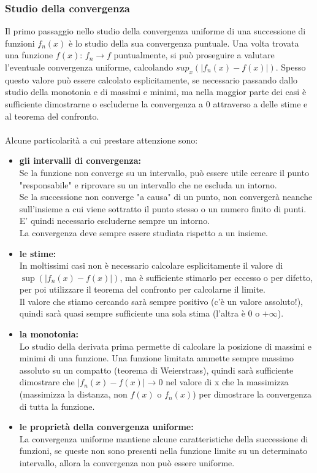 \documentclass{article}
\begin{document}
\subsubsection{Studio della convergenza}
Il primo passaggio nello studio della convergenza uniforme di una successione di funzioni $f_n(x)$ è lo studio della sua convergenza puntuale. Una volta trovata una funzione $f(x)$: $f_n\rightarrow f$ puntualmente, si può proseguire a valutare l'eventuale convergenza uniforme, calcolando $sup_x(|f_n(x)-f(x)|)$. Spesso questo valore può essere calcolato esplicitamente, se necessario passando dallo studio della monotonia e di massimi e minimi, ma nella maggior parte dei casi è sufficiente dimostrarne o escluderne la convergenza a 0 attraverso a delle stime e al teorema del confronto.\\\\
Alcune particolarità a cui prestare attenzione sono:
\begin{itemize}
    \item \textbf{gli intervalli di convergenza:}\\
    Se la funzione non converge su un intervallo, può essere utile cercare il punto "responsabile" e riprovare su un intervallo che ne escluda un intorno.\\
    Se la successione non converge "a causa" di un punto, non convergerà neanche sull'insieme a cui viene sottratto il punto stesso o un numero finito di punti. E' quindi necessario escluderne sempre un intorno.\\
    La convergenza deve sempre essere studiata rispetto a un insieme.
    \item \textbf{le stime:}\\
    In moltissimi casi non è necessario calcolare esplicitamente il valore di $\sup(|f_n(x)-f(x)|)$, ma è sufficiente stimarlo per eccesso o per difetto, per poi utilizzare il teorema del confronto per calcolarne il limite.\\
    Il valore che stiamo cercando sarà sempre positivo (c'è un valore assoluto!), quindi sarà quasi sempre sufficiente una sola stima (l'altra è 0 o $+\infty$).
    \item \textbf{la monotonia:}\\
    Lo studio della derivata prima permette di calcolare la posizione di massimi e minimi di una funzione. Una funzione limitata ammette sempre massimo assoluto su un compatto (teorema di Weierstrass), quindi sarà sufficiente dimostrare che $|f_n(x)-f(x)|\rightarrow0$ nel valore di x che la massimizza (massimizza la distanza, non $f(x)$ o $f_n(x)$) per dimostrare la convergenza di tutta la funzione.
    \item \textbf{le proprietà della convergenza uniforme:}\\
    La convergenza uniforme mantiene alcune caratteristiche della successione di funzioni, se queste non sono presenti nella funzione limite su un determinato intervallo, allora la convergenza non può essere uniforme.
\end{itemize}
\end{document}
